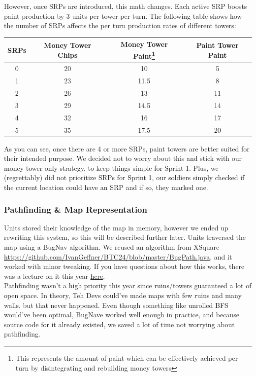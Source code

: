 \documentclass{article}
\begin{document}
  However, once SRPs are introduced, this math changes. Each active SRP boosts paint production by 3 units per tower per turn. The following table shows how the number of SRPs affects the per turn production rates of different towers:
  \begin{center}
    \begin{tabular}{c | c | c | c}
      SRPs & Money Tower Chips & Money Tower Paint\footnote{This represents the amount of paint which can be effectively achieved per turn by disintegrating and rebuilding money towers} & Paint Tower Paint \\
      \hline
      0 & 20 & 10 & 5 \\
      1 & 23 & 11.5 & 8 \\
      2 & 26 & 13 & 11 \\
      3 & 29 & 14.5 & 14 \\
      4 & 32 & 16 & 17 \\
      5 & 35 & 17.5 & 20
    \end{tabular}
  \end{center}
  As you can see, once there are 4 or more SRPs, paint towers are better suited for their intended purpose. We decided not to worry about this and stick with our money tower only strategy, to keep things simple for Sprint 1. Plus, we (regrettably) did not prioritize SRPs for Sprint 1, our soldiers simply checked if the current location could have an SRP and if so, they marked one.

  \subsubsection{Pathfinding \& Map Representation}

  Units stored their knowledge of the map in memory, however we ended up rewriting this system, so this will be described further later. Units traversed the map using a BugNav algorithm. We reused an algorithm from XSquare \url{https://github.com/IvanGeffner/BTC24/blob/master/BugPath.java}, and it worked with minor tweaking. If you have questions about how this works, there was a lecture on it this year \href{https://www.youtube.com/live/Mqk50BQH3oQ?si=6qL5WAXmSOS2K3OR}{here}.\\
  Pathfinding wasn't a high priority this year since ruins/towers guaranteed a lot of open space. In theory, Teh Devs could've made maps with few ruins and many walls, but that never happened. Even though something like unrolled BFS would've been optimal, BugNave worked well enough in practice, and because source code for it already existed, we saved a lot of time not worrying about pathfinding.
  
\end{document}
